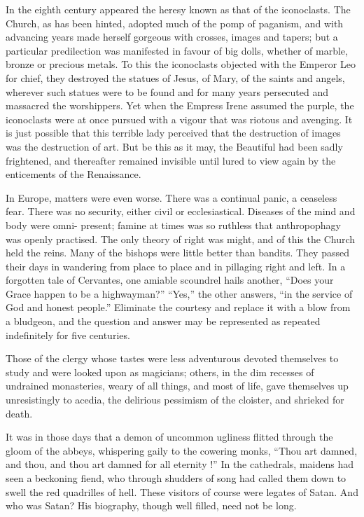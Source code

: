 \documentclass[]{book}
\begin{document}
In the eighth century appeared the heresy known as that of the
iconoclasts. The Church, as has been hinted, adopted much of the pomp of
paganism, and with advancing years made herself gorgeous with crosses,
images and tapers; but a particular predilection was manifested in
favour of big dolls, whether of marble, bronze or precious metals. To
this the iconoclasts objected with the Emperor Leo for chief, they
destroyed the statues of Jesus, of Mary, of the saints and angels,
wherever such statues were to be found and for many years persecuted and
massacred the worshippers. Yet when the Empress Irene assumed the
purple, the iconoclasts were at once pursued with a vigour that was
riotous and avenging. It is just possible that this terrible lady
perceived that the destruction of images was the destruction of art. But
be this as it may, the Beautiful had been sadly frightened, and
thereafter remained invisible until lured to view again by the
enticements of the Renaissance.

In Europe, matters were even worse. There was a continual panic, a
ceaseless fear. There was no security, either civil or ecclesiastical.
Diseases of the mind and body were omni- present; famine at times was so
ruthless that anthropophagy was openly practised. The only theory of
right was might, and of this the Church held the reins. Many of the
bishops were little better than bandits. They passed their days in
wandering from place to place and in pillaging right and left. In a
forgotten tale of Cervantes, one amiable scoundrel hails another, ``Does
your Grace happen to be a highwayman?'' ``Yes,'' the other answers, ``in
the service of God and honest people.'' Eliminate the courtesy and
replace it with a blow from a bludgeon, and the question and answer may
be represented as repeated indefinitely for five centuries.

Those of the clergy whose tastes were less adventurous devoted
themselves to study and were looked upon as magicians; others, in the
dim recesses of undrained monasteries, weary of all things, and most of
life, gave themselves up unresistingly to acedia, the delirious
pessimism of the cloister, and shrieked for death.

It was in those days that a demon of uncommon ugliness flitted through
the gloom of the abbeys, whispering gaily to the cowering monks, ``Thou
art damned, and thou, and thou art damned for all eternity !'' In the
cathedrals, maidens had seen a beckoning fiend, who through shudders of
song had called them down to swell the red quadrilles of hell. These
visitors of course were legates of Satan. And who was Satan? His
biography, though well filled, need not be long.
\end{document}
